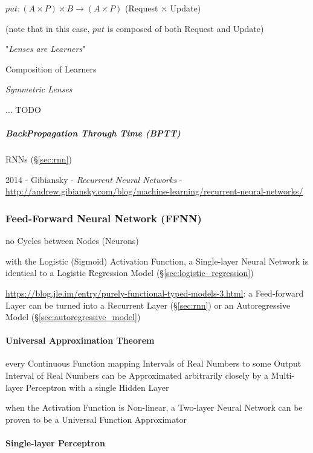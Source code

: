$put : (A \times P) \times B \to (A \times P)$ (Request $\times$ Update)

(note that in this case, $put$ is composed of both Request and Update)

"\emph{Lenses are Learners}"

Composition of Learners

\emph{Symmetric Lenses}

... TODO



\subparagraph{BackPropagation Through Time (BPTT)}\label{sec:bptt}\hfill

RNNs (\S\ref{sec:rnn})

2014 - Gibiansky - \emph{Recurrent Neural Networks} -
\url{http://andrew.gibiansky.com/blog/machine-learning/recurrent-neural-networks/}



\subsubsection{Feed-Forward Neural Network (FFNN)}\label{sec:ffnn}

no Cycles between Nodes (Neurons)

with the Logistic (Sigmoid) Activation Function, a Single-layer Neural Network
is identical to a Logistic Regression Model (\S\ref{sec:logistic_regression})

\url{https://blog.jle.im/entry/purely-functional-typed-models-3.html}: a
Feed-forward Layer can be turned into a Recurrent Layer (\S\ref{sec:rnn}) or an
Autoregressive Model (\S\ref{sec:autoregressive_model})



\paragraph{Universal Approximation Theorem}
\label{sec:universal_approximation}\hfill

every Continuous Function mapping Intervals of Real Numbers to some Output
Interval of Real Numbers can be Approximated arbitrarily closely by a
Multi-layer Perceptron with a single Hidden Layer

when the Activation Function is Non-linear, a Two-layer Neural Network can be
proven to be a Universal Function Approximator



\paragraph{Single-layer Perceptron}\label{sec:single_layer_perceptron}\hfill

